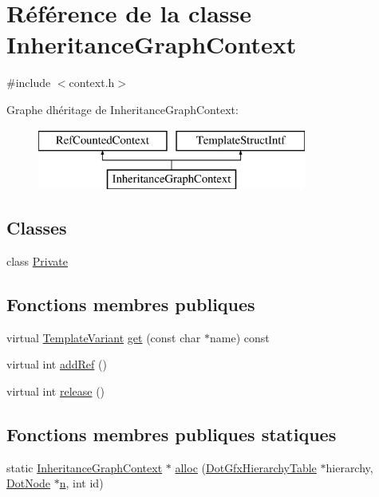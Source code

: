 \hypertarget{class_inheritance_graph_context}{}\section{Référence de la classe Inheritance\+Graph\+Context}
\label{class_inheritance_graph_context}


{\ttfamily \#include $<$context.\+h$>$}

Graphe d\textquotesingle{}héritage de Inheritance\+Graph\+Context\+:\begin{figure}[H]
\begin{center}
\leavevmode
\includegraphics[height=2.000000cm]{class_inheritance_graph_context}
\end{center}
\end{figure}
\subsection*{Classes}
\begin{DoxyCompactItemize}
\item 
class \hyperlink{class_inheritance_graph_context_1_1_private}{Private}
\end{DoxyCompactItemize}
\subsection*{Fonctions membres publiques}
\begin{DoxyCompactItemize}
\item 
virtual \hyperlink{class_template_variant}{Template\+Variant} \hyperlink{class_inheritance_graph_context_ac05e56fcbdb887b86e363e343b38338b}{get} (const char $\ast$name) const 
\item 
virtual int \hyperlink{class_inheritance_graph_context_a015d84370ad12f94eec44da91e59c631}{add\+Ref} ()
\item 
virtual int \hyperlink{class_inheritance_graph_context_ac793f53cb0f72b1b9e2f6920c2667c61}{release} ()
\end{DoxyCompactItemize}
\subsection*{Fonctions membres publiques statiques}
\begin{DoxyCompactItemize}
\item 
static \hyperlink{class_inheritance_graph_context}{Inheritance\+Graph\+Context} $\ast$ \hyperlink{class_inheritance_graph_context_a5635612a1c9609d0257ad999fc0b6dca}{alloc} (\hyperlink{class_dot_gfx_hierarchy_table}{Dot\+Gfx\+Hierarchy\+Table} $\ast$hierarchy, \hyperlink{class_dot_node}{Dot\+Node} $\ast$\hyperlink{060__command__switch_8tcl_acdde3cd86eb2421ce8dbb2e85227d368}{n}, int id)
\end{DoxyCompactItemize}



